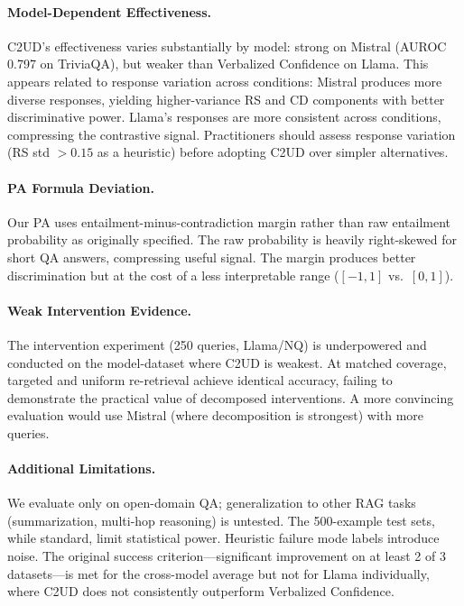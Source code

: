 \documentclass{article}
\newcommand{\ours}{\textsc{C2UD}}
\begin{document}
\paragraph{Model-Dependent Effectiveness.}
\ours{}'s effectiveness varies substantially by model: strong on Mistral (AUROC 0.797 on TriviaQA), but weaker than Verbalized Confidence on Llama.
This appears related to response variation across conditions: Mistral produces more diverse responses, yielding higher-variance RS and CD components with better discriminative power.
Llama's responses are more consistent across conditions, compressing the contrastive signal.
Practitioners should assess response variation (RS std $> 0.15$ as a heuristic) before adopting \ours{} over simpler alternatives.

\paragraph{PA Formula Deviation.}
Our PA uses entailment-minus-contradiction margin rather than raw entailment probability as originally specified.
The raw probability is heavily right-skewed for short QA answers, compressing useful signal.
The margin produces better discrimination but at the cost of a less interpretable range ($[-1, 1]$ vs.\ $[0, 1]$).

\paragraph{Weak Intervention Evidence.}
The intervention experiment (250 queries, Llama/NQ) is underpowered and conducted on the model-dataset where \ours{} is weakest.
At matched coverage, targeted and uniform re-retrieval achieve identical accuracy, failing to demonstrate the practical value of decomposed interventions.
A more convincing evaluation would use Mistral (where decomposition is strongest) with more queries.

\paragraph{Additional Limitations.}
We evaluate only on open-domain QA; generalization to other RAG tasks (summarization, multi-hop reasoning) is untested.
The 500-example test sets, while standard, limit statistical power.
Heuristic failure mode labels introduce noise.
The original success criterion---significant improvement on at least 2 of 3 datasets---is met for the cross-model average but not for Llama individually, where \ours{} does not consistently outperform Verbalized Confidence.
\end{document}
